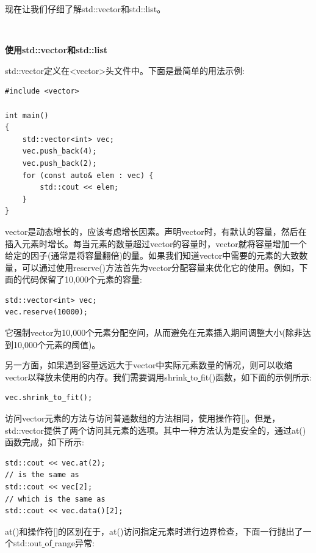 现在让我们仔细了解std::vector和std::list。  \par

\noindent\textbf{}\ \par
\textbf{使用std::vector和std::list} \ \par
std::vector定义在<vector>头文件中。下面是最简单的用法示例: \par

\begin{lstlisting}[caption={}]
#include <vector>

int main()
{
	std::vector<int> vec;
	vec.push_back(4);
	vec.push_back(2);
	for (const auto& elem : vec) {
		std::cout << elem;
	}
}
\end{lstlisting}

vector是动态增长的，应该考虑增长因素。声明vector时，有默认的容量，然后在插入元素时增长。每当元素的数量超过vector的容量时，vector就将容量增加一个给定的因子(通常是将容量翻倍)的量。如果我们知道vector中需要的元素的大致数量，可以通过使用reserve()方法首先为vector分配容量来优化它的使用。例如，下面的代码保留了10,000个元素的容量: \par

\begin{lstlisting}[caption={}]
std::vector<int> vec;
vec.reserve(10000);
\end{lstlisting}

它强制vector为10,000个元素分配空间，从而避免在元素插入期间调整大小(除非达到10,000个元素的阈值)。 \par
另一方面，如果遇到容量远远大于vector中实际元素数量的情况，则可以收缩vector以释放未使用的内存。我们需要调用shrink\underline{ }to\underline{ }fit()函数，如下面的示例所示: \par

\begin{lstlisting}[caption={}]
vec.shrink_to_fit();
\end{lstlisting}

访问vector元素的方法与访问普通数组的方法相同，使用操作符[]。但是，std::vector提供了两个访问其元素的选项。其中一种方法认为是安全的，通过at()函数完成，如下所示: \par

\begin{lstlisting}[caption={}]
std::cout << vec.at(2);
// is the same as
std::cout << vec[2];
// which is the same as
std::cout << vec.data()[2];
\end{lstlisting}

at()和操作符[]的区别在于，at()访问指定元素时进行边界检查，下面一行抛出了一个std::out\underline{ }of\underline{ }range异常: \par

